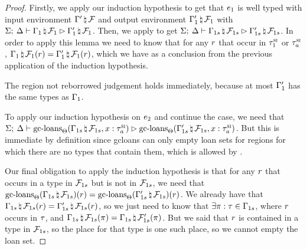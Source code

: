 \begin{proof}
  Firstly, we apply our induction hypothesis to get that $e_1$ is well
  typed with input environment $\Gamma^\prime \, \natural \, \mathcal{F}$ and
  output environment $\Gamma_1^\prime \, \natural \, \mathcal{F}_1$ with
  $\Sigma; \: \Delta \vdash \Gamma_1 \, \natural \, \mathcal{F}_1 \rhd \Gamma_1^\prime \, \natural \, \mathcal{F}_1$.
  Then, we apply  to get
  $\Sigma; \: \Delta \vdash \Gamma_{1s} \, \natural \, \mathcal{F}_{1s} \rhd \Gamma_{1s}^\prime \, \natural \, \mathcal{F}_{1s}$.
  In order to apply this lemma we need to know that for any $r$ that
  occur in $\tau^\textsc{si}_1$ or $\tau^\textsc{si}_a$,
  $\Gamma_1 \, \natural \, \mathcal{F}_1(r) =
  \Gamma_1^\prime \, \natural \, \mathcal{F}_1(r)$, which we have as a
  conclusion from the previous application of the induction hypothesis.

  The region not reborrowed judgement holds immediately, because at most
  $\Gamma_1^\prime$ has the same types as $\Gamma_1$.

  To apply our induction hypothesis on $e_2$ and continue the case, we need that \\
  $\Sigma; \: \Delta \vdash \textrm{gc-loans}_{\Theta}(\Gamma_{1s} \, \natural \, \mathcal{F}_{1s},
      x :
      \tau^\textsc{si}_a) \rhd \textrm{gc-loans}_{\Theta}(\Gamma_{1s}^\prime \, \natural \, \mathcal{F}_{1s},
      x : \tau^\textsc{si}_a)$. But this is immediate by definition since gcloans
  can only empty loan sets for regions for which there are no types that contain
  them, which is allowed by .

  Our final obligation to apply the induction hypothesis is that for any
  $r$ that occurs in a type in $\mathcal{F}_{1s}$ but is not in
  $\mathcal{F}_{1s}$, we need that
  $\textrm{gc-loans}_{\Theta}(\Gamma_{1s} \, \natural \, \mathcal{F}_{1s})(r)
  =
  \textrm{gc-loans}_{\Theta}(\Gamma_{1s}^\prime \, \natural \, \mathcal{F}_{1s})(r)$.
  We already have that $\Gamma_{1s} \, \natural \, \mathcal{F}_{1s}(r) =
  \Gamma_{1s}^\prime \, \natural \, \mathcal{F}_{1s}(r)$, so we just need
  to know that $\exists \pi : \tau \in \Gamma_{1s}$, where $r$
  occurs in $\tau$, and $\Gamma_{1s} \, \natural \, \mathcal{F}_{1s}(\pi)
  = \Gamma_{1s} \, \natural \, \mathcal{F}_{1s}^\prime(\pi)$. But we said
  that $r$ is contained in a type in $\mathcal{F}_{1s}$, so the place for
  that type is one such place, so we cannot empty the loan set.


\end{proof}
